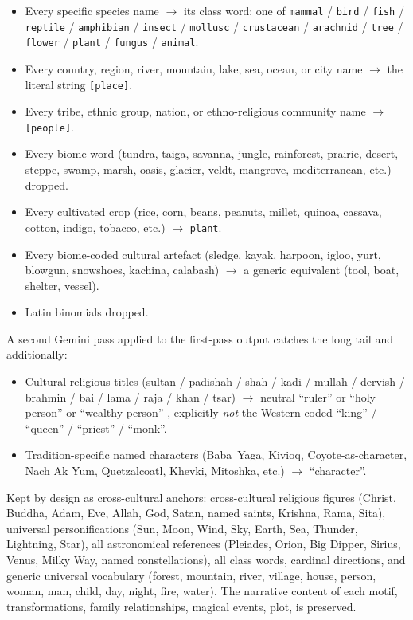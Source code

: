 \documentclass[11pt,a4paper]{article}
\begin{document}
\begin{itemize}\itemsep1pt
\item Every specific species name $\to$ its class word: one of
  \texttt{mammal} / \texttt{bird} / \texttt{fish} / \texttt{reptile}
  / \texttt{amphibian} / \texttt{insect} / \texttt{mollusc} /
  \texttt{crustacean} / \texttt{arachnid} / \texttt{tree} /
  \texttt{flower} / \texttt{plant} / \texttt{fungus} /
  \texttt{animal}.
\item Every country, region, river, mountain, lake, sea, ocean, or
  city name $\to$ the literal string \texttt{[place]}.
\item Every tribe, ethnic group, nation, or ethno-religious
  community name $\to$ \texttt{[people]}.
\item Every biome word (tundra, taiga, savanna, jungle, rainforest,
  prairie, desert, steppe, swamp, marsh, oasis, glacier, veldt,
  mangrove, mediterranean, etc.) dropped.
\item Every cultivated crop (rice, corn, beans, peanuts, millet,
  quinoa, cassava, cotton, indigo, tobacco, etc.) $\to$
  \texttt{plant}.
\item Every biome-coded cultural artefact (sledge, kayak, harpoon,
  igloo, yurt, blowgun, snowshoes, kachina, calabash) $\to$ a
  generic equivalent (tool, boat, shelter, vessel).
\item Latin binomials dropped.
\end{itemize}

A second Gemini pass applied to the first-pass output catches the
long tail and additionally:

\begin{itemize}\itemsep1pt
\item Cultural-religious titles (sultan / padishah / shah / kadi /
  mullah / dervish / brahmin / bai / lama / raja / khan / tsar)
  $\to$ neutral ``ruler'' or ``holy person'' or ``wealthy person''
 , explicitly \emph{not} the Western-coded ``king'' / ``queen''
  / ``priest'' / ``monk''.
\item Tradition-specific named characters (Baba~Yaga, Kivioq,
  Coyote-as-character, Nach Ak Yum, Quetzalcoatl, Khevki,
  Mitoshka, etc.) $\to$ ``character''.
\end{itemize}

Kept by design as cross-cultural anchors: cross-cultural religious
figures (Christ, Buddha, Adam, Eve, Allah, God, Satan, named
saints, Krishna, Rama, Sita), universal personifications (Sun,
Moon, Wind, Sky, Earth, Sea, Thunder, Lightning, Star), all
astronomical references (Pleiades, Orion, Big Dipper, Sirius,
Venus, Milky Way, named constellations), all class words, cardinal
directions, and generic universal vocabulary (forest, mountain,
river, village, house, person, woman, man, child, day, night,
fire, water). The narrative content of each motif, transformations,
family relationships, magical events, plot, is preserved.
\end{document}
